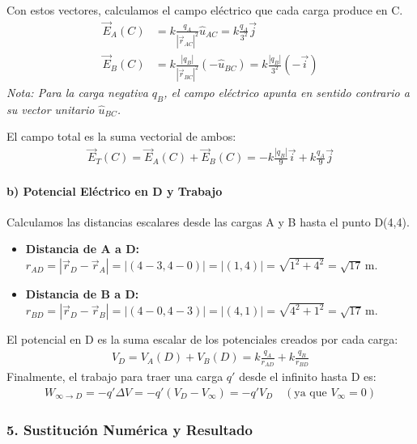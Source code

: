 \medskip
Con estos vectores, calculamos el campo eléctrico que cada carga produce en C.
\begin{align*}
    \vec{E}_A(C) &= k \frac{q_A}{|\vec{r}_{AC}|^2} \hat{u}_{AC} = k \frac{q_A}{3^2} \vec{j} \\
    \vec{E}_B(C) &= k \frac{|q_B|}{|\vec{r}_{BC}|^2} (-\hat{u}_{BC}) = k \frac{|q_B|}{3^2} (-\vec{i})
\end{align*}
\textit{Nota: Para la carga negativa $q_B$, el campo eléctrico apunta en sentido contrario a su vector unitario $\hat{u}_{BC}$.}

\medskip
El campo total es la suma vectorial de ambos:
\begin{gather*}
    \vec{E}_T(C) = \vec{E}_A(C) + \vec{E}_B(C) = -k \frac{|q_B|}{9}\vec{i} + k \frac{q_A}{9}\vec{j}
\end{gather*}

\paragraph*{b) Potencial Eléctrico en D y Trabajo}
Calculamos las distancias escalares desde las cargas A y B hasta el punto D(4,4).
\begin{itemize}
    \setlength{\itemsep}{0pt}\setlength{\parskip}{0pt}
    \item \textbf{Distancia de A a D:} $r_{AD} = |\vec{r}_D - \vec{r}_A| = |(4-3, 4-0)| = |(1,4)| = \sqrt{1^2+4^2} = \sqrt{17} \, \text{m}$.
    \item \textbf{Distancia de B a D:} $r_{BD} = |\vec{r}_D - \vec{r}_B| = |(4-0, 4-3)| = |(4,1)| = \sqrt{4^2+1^2} = \sqrt{17} \, \text{m}$.
\end{itemize}

\medskip
El potencial en D es la suma escalar de los potenciales creados por cada carga:
\begin{gather*}
    V_D = V_A(D) + V_B(D) = k \frac{q_A}{r_{AD}} + k \frac{q_B}{r_{BD}}
\end{gather*}
Finalmente, el trabajo para traer una carga $q'$ desde el infinito hasta D es:
\begin{gather*}
    W_{\infty \to D} = -q'\Delta V = -q'(V_D - V_\infty) = -q'V_D \quad (\text{ya que } V_\infty = 0)
\end{gather*}
\subsubsection*{5. Sustitución Numérica y Resultado}
